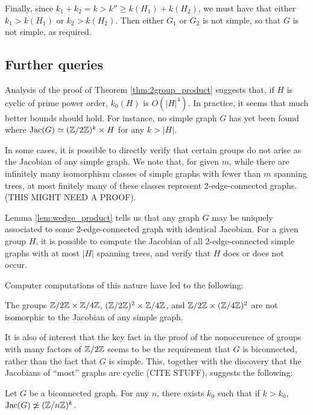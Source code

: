 \documentclass{amsart}
\begin{document}
Finally, since $k_1 + k_2 = k > k'' \ge k(H_1) + k(H_2)$, we must have
that either $k_1 > k(H_1)$ or $k_2 > k(H_2)$. Then either $G_1$ or
$G_2$ is not simple, so that $G$ is not simple, as required.

\subsection{Further queries} 

Analysis of the proof of Theorem \ref{thm:2group_product} suggests
that, if $H$ is cyclic of prime power order, $k_0(H)$ is
$O(|H|^4)$. In practice, it seems that much better bounds should
hold. For instance, no simple graph $G$ has yet been found where
$\operatorname{Jac}(G) \simeq (\mathbb{Z}/2\mathbb{Z})^k \times H$ for any $k > |H|$.

In some cases, it is possible to directly verify that certain groups
do not arise as the Jacobian of any simple graph. We note that, for
given $m$, while there are infinitely many isomorphism classes of
simple graphs with fewer than $m$ spanning trees, at most finitely
many of these classes represent 2-edge-connected graphs. (THIS MIGHT
NEED A PROOF).

Lemma \ref{lem:wedge_product} tells us that any graph $G$ may be
uniquely associated to some 2-edge-connected graph with identical
Jacobian. For a given group $H$, it is possible to compute the
Jacobian of all 2-edge-connected simple graphs with at most $|H|$
spanning trees, and verify that $H$ does or does not occur. 

Computer computations of this nature have led to the following:

\begin{prop}
  The groups $\mathbb{Z}/2\mathbb{Z} \times \mathbb{Z}/4\mathbb{Z}$, $(\mathbb{Z}/2\mathbb{Z})^2 \times \mathbb{Z}/4\mathbb{Z}$, and
  $\mathbb{Z}/2\mathbb{Z} \times (\mathbb{Z}/4\mathbb{Z})^2$ are not isomorphic to the Jacobian of any
  simple graph.
\end{prop}

It is also of interest that the key fact in the proof of the
nonoccurence of groups with many factors of $\mathbb{Z}/2\mathbb{Z}$ seems to be the
requirement that $G$ is biconnected, rather than the fact that $G$ is
simple. This, together with the discovery that the Jacobians of ``most''
graphs are cyclic (CITE STUFF), suggests the following:

\begin{conj}
  Let $G$ be a biconnected graph. For any $n$, there exists $k_0$ such
  that if $k > k_0$, $\operatorname{Jac}(G) \not\simeq (\mathbb{Z}/n\mathbb{Z})^k$.
\end{conj}
\end{document}
